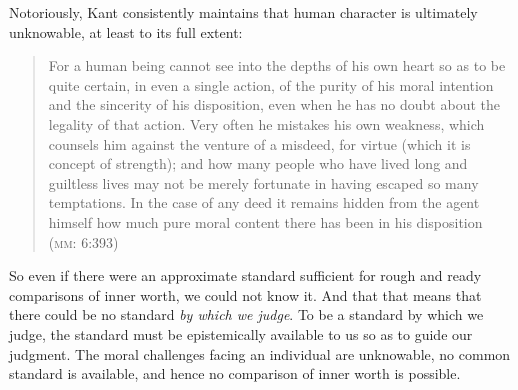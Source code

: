 \documentclass[a4paper,12pt]{article}
\begin{document}

Notoriously, Kant consistently maintains that human character is ultimately unknowable, at least to its full extent:
\begin{quote}
	For a human being cannot see into the depths of his own heart so as to be quite certain, in even a single action, of the purity of his moral intention and the sincerity of his disposition, even when he has no doubt about the legality of that action. Very often he mistakes his own weakness, which counsels him against the venture of a misdeed, for virtue (which it is concept of strength); and how many people who have lived long and guiltless lives may not be merely fortunate in having escaped so many temptations. In the case of any deed it remains hidden from the agent himself how much pure moral content there has been in his disposition (\textsc{mm}: 6:393)
\end{quote}
So even if there were an approximate standard sufficient for rough and ready comparisons of inner worth, we could not know it. And that that means that there could be no standard \emph{by which we judge}. To be a standard by which we judge, the standard must be epistemically available to us so as to guide our judgment. The moral challenges facing an individual are unknowable, no common standard is available, and hence no comparison of inner worth is possible.
\end{document}
